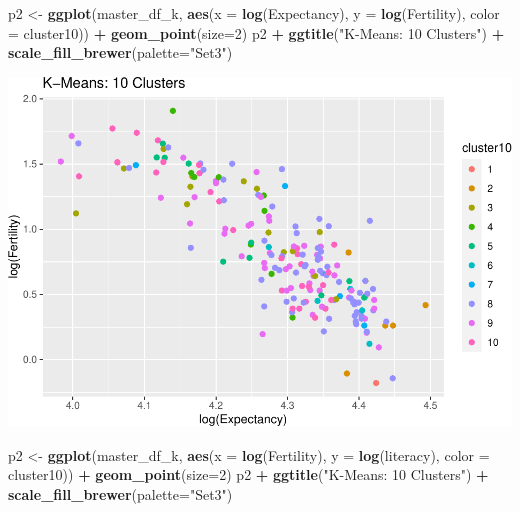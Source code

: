 \documentclass[]{article}
\newenvironment{Shaded}{\begin{snugshade}}{\end{snugshade}}
\newcommand{\DataTypeTok}[1]{\textcolor[rgb]{0.13,0.29,0.53}{#1}}
\newcommand{\DecValTok}[1]{\textcolor[rgb]{0.00,0.00,0.81}{#1}}
\newcommand{\KeywordTok}[1]{\textcolor[rgb]{0.13,0.29,0.53}{\textbf{#1}}}
\newcommand{\NormalTok}[1]{#1}
\newcommand{\OperatorTok}[1]{\textcolor[rgb]{0.81,0.36,0.00}{\textbf{#1}}}
\newcommand{\StringTok}[1]{\textcolor[rgb]{0.31,0.60,0.02}{#1}}
\begin{document}
\begin{Shaded}
\begin{Highlighting}[]
\NormalTok{p2 <-}\StringTok{ }\KeywordTok{ggplot}\NormalTok{(master_df_k, }\KeywordTok{aes}\NormalTok{(}\DataTypeTok{x =} \KeywordTok{log}\NormalTok{(Expectancy), }\DataTypeTok{y =} \KeywordTok{log}\NormalTok{(Fertility), }\DataTypeTok{color =}\NormalTok{ cluster10)) }\OperatorTok{+}
\StringTok{  }\KeywordTok{geom_point}\NormalTok{(}\DataTypeTok{size=}\DecValTok{2}\NormalTok{)}
\NormalTok{p2 }\OperatorTok{+}\StringTok{ }\KeywordTok{ggtitle}\NormalTok{(}\StringTok{"K-Means: 10 Clusters"}\NormalTok{) }\OperatorTok{+}\StringTok{ }\KeywordTok{scale_fill_brewer}\NormalTok{(}\DataTypeTok{palette=}\StringTok{"Set3"}\NormalTok{)}
\end{Highlighting}
\end{Shaded}

\includegraphics{eda_files/figure-latex/unnamed-chunk-29-9.pdf}

\begin{Shaded}
\begin{Highlighting}[]
\NormalTok{p2 <-}\StringTok{ }\KeywordTok{ggplot}\NormalTok{(master_df_k, }\KeywordTok{aes}\NormalTok{(}\DataTypeTok{x =} \KeywordTok{log}\NormalTok{(Fertility), }\DataTypeTok{y =} \KeywordTok{log}\NormalTok{(literacy), }\DataTypeTok{color =}\NormalTok{ cluster10)) }\OperatorTok{+}
\StringTok{  }\KeywordTok{geom_point}\NormalTok{(}\DataTypeTok{size=}\DecValTok{2}\NormalTok{)}
\NormalTok{p2 }\OperatorTok{+}\StringTok{ }\KeywordTok{ggtitle}\NormalTok{(}\StringTok{"K-Means: 10 Clusters"}\NormalTok{) }\OperatorTok{+}\StringTok{ }\KeywordTok{scale_fill_brewer}\NormalTok{(}\DataTypeTok{palette=}\StringTok{"Set3"}\NormalTok{)}
\end{Highlighting}
\end{Shaded}
\end{document}
